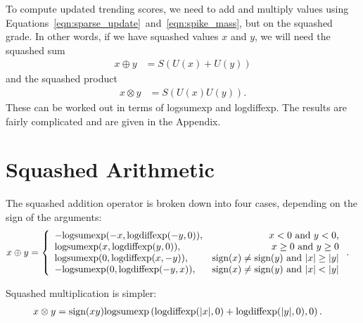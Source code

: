 \documentclass[a4paper, 12pt]{article}
\newcommand{\logsumexp}{\textnormal{logsumexp}}
\newcommand{\logdiffexp}{\textnormal{logdiffexp}}
\newcommand{\sign}{\textnormal{sign}}
\begin{document}
To compute updated trending scores, we need to add and multiply
values using Equations~\ref{eqn:sparse_update}~and~\ref{eqn:spike_mass}, but on the
squashed grade. In other words, if we have squashed values $x$ and
$y$, we will need the squashed sum
\begin{align}
x \oplus y &= S(U(x) + U(y))
\end{align}
and the squashed product
\begin{align}
x \otimes y &= S(U(x)U(y)).
\end{align}
These can be worked out in terms of logsumexp and logdiffexp.
The results are fairly complicated and are given in the Appendix.





\appendix
\section{Squashed Arithmetic}
The squashed addition operator is broken down into four cases, depending
on the sign of the arguments:
\begin{align}
x \oplus y &= \left\{
    \begin{array}{lr}
   -\logsumexp(-x, \logdiffexp(-y, 0)),& x < 0~\textnormal{and}~y < 0, \\
    \logsumexp(x, \logdiffexp(y, 0)),& x \geq 0~\textnormal{and}~y \geq 0 \\
    \logsumexp(0, \logdiffexp(x, -y)), & \sign(x) \neq \sign(y)~\textnormal{and}~|x| \geq |y|\\
    -\logsumexp(0, \logdiffexp(-y, x)), & \sign(x) \neq \sign(y)~\textnormal{and}~|x| < |y|
    \end{array}
\right. .
\end{align}

Squashed multiplication is simpler:
\begin{align}
x \otimes y &= \sign(xy)
                \logsumexp\left(
                    \logdiffexp(|x|, 0) + \logdiffexp(|y|, 0),
                0\right).
\end{align}
\end{document}
